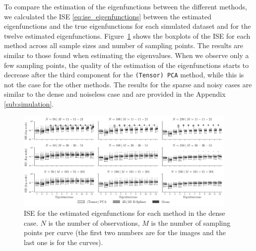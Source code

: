 \begin{results}
To compare the estimation of the eigenfunctions between the different methods, we calculated the ISE \eqref{eq:ise_eigenfunctions} between the estimated eigenfunctions and the true eigenfunctions for each simulated dataset and for the twelve estimated eigenfunctions. Figure~\ref{fig:ise_mfd_1d} shows the boxplots of the ISE for each method across all sample sizes and number of sampling points. The results are similar to those found when estimating the eigenvalues. When we observe only a few sampling points, the quality of the estimation of the eigenfunctions starts to decrease after the third component for the \texttt{(Tensor) PCA} method, while this is not the case for the other methods. The results for the sparse and noisy cases are similar to the dense and noiseless case and are provided in the Appendix \ref{sub:simulation}.
\begin{figure}
     \centering
    \includegraphics[width=0.95\textwidth]{figures/ISE}
    \caption{ISE for the estimated eigenfunctions for each method in the dense case. $N$ is the number of observations, $M$ is the number of sampling points per curve (the first two numbers are for the images and the last one is for the curves).}
    \label{fig:ise_mfd_1d}
\end{figure}
\end{results}


